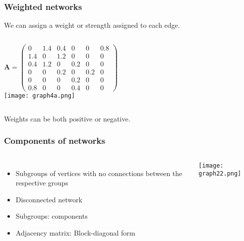\documentclass[10pt,aspectratio=169,dvipsnames]{beamer}
\let\olditem\item
\renewcommand{\item}{%
\olditem\vspace{5pt}}
\begin{document}
\begin{frame}
\frametitle{Weighted networks}
We can assign a \alert{weight} or \alert{strength} assigned to each edge.
  \begin{columns}
\begin{equation*}
\mathbf{A}=\left(\begin{matrix}
0 & 1.4 & 0.4 & 0 & 0 & 0.8\\
1.4 & 0 & 1.2 & 0 & 0 & 0\\
0.4 & 1.2 & 0 & 0.2 & 0 & 0\\
0 & 0 & 0.2 & 0 & 0.2 & 0\\
0 & 0 & 0 & 0.2 & 0 & 0\\
0.8 & 0 & 0 & 0.4 & 0 & 0
\end{matrix}\right)
\end{equation*}
\texttt{[image: graph4a.png]}
\end{columns}
Weights can be both positive or negative.
\end{frame}
\begin{frame}
\frametitle{Components of networks}
\begin{columns}
\begin{itemize}
\item Subgroups of vertices with no connections between the respective groups
\item \alert{Disconnected} network
\item Subgroups: \alert{components}
\item Adjacency matrix: Block-diagonal form
\end{itemize}
\texttt{[image: graph22.png]}\end{columns}
\end{frame}
\end{document}
